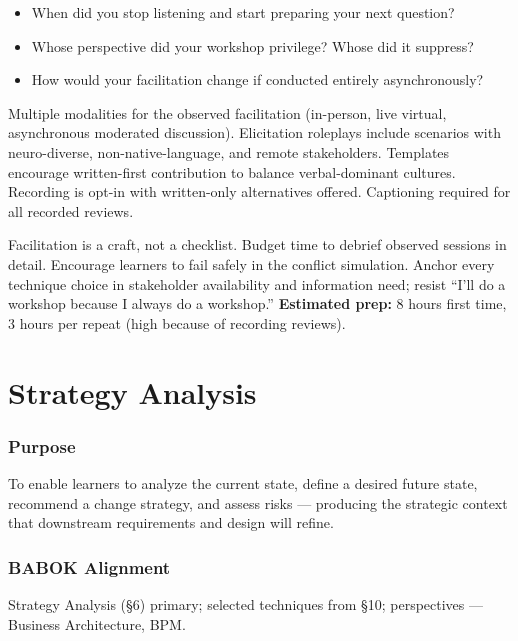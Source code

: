 \documentclass[11pt,letterpaper,oneside]{report}
\begin{document}
\begin{curriculumreflection}
\begin{itemize}
  \item When did you stop listening and start preparing your next question?
  \item Whose perspective did your workshop privilege? Whose did it suppress?
  \item How would your facilitation change if conducted entirely asynchronously?
\end{itemize}
\end{curriculumreflection}

\begin{curriculumnote}
Multiple modalities for the observed facilitation (in-person, live virtual, asynchronous moderated discussion). Elicitation roleplays include scenarios with neuro-diverse, non-native-language, and remote stakeholders. Templates encourage written-first contribution to balance verbal-dominant cultures. Recording is opt-in with written-only alternatives offered. Captioning required for all recorded reviews.
\end{curriculumnote}

\begin{curriculumteachingnotes}
Facilitation is a craft, not a checklist. Budget time to debrief observed sessions in detail. Encourage learners to fail safely in the conflict simulation. Anchor every technique choice in stakeholder availability and information need; resist ``I'll do a workshop because I always do a workshop.'' \textbf{Estimated prep:} 8 hours first time, 3 hours per repeat (high because of recording reviews).
\end{curriculumteachingnotes}

\chapter{Strategy Analysis}

\subsection*{Purpose}
To enable learners to analyze the current state, define a desired future state, recommend a change strategy, and assess risks --- producing the strategic context that downstream requirements and design will refine.

\subsection*{BABOK Alignment}
Strategy Analysis (\S6) primary; selected techniques from \S10; perspectives --- Business Architecture, BPM.
\end{document}
